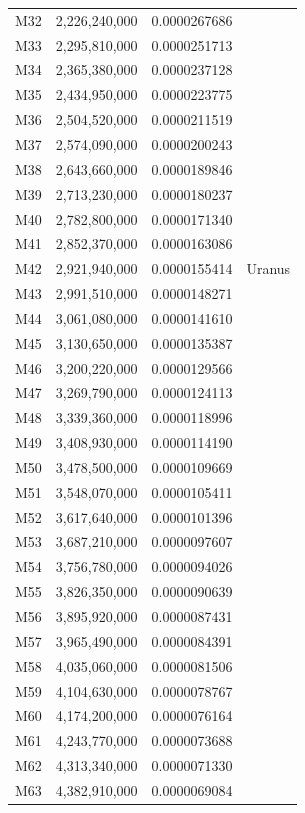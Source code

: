 \documentclass[11pt, a4paper]{article}
\begin{document}
\begin{longtable}{@{} c c c l @{}}
  M32 & 2,226,240,000 & 0.0000267686 &  \\
  M33 & 2,295,810,000 & 0.0000251713 &  \\
  M34 & 2,365,380,000 & 0.0000237128 &  \\
  M35 & 2,434,950,000 & 0.0000223775 &  \\
  M36 & 2,504,520,000 & 0.0000211519 &  \\
  M37 & 2,574,090,000 & 0.0000200243 &  \\
  M38 & 2,643,660,000 & 0.0000189846 &  \\
  M39 & 2,713,230,000 & 0.0000180237 &  \\
  M40 & 2,782,800,000 & 0.0000171340 &  \\
  M41 & 2,852,370,000 & 0.0000163086 &  \\
  M42 & 2,921,940,000 & 0.0000155414 & Uranus \\
  M43 & 2,991,510,000 & 0.0000148271 &  \\
  M44 & 3,061,080,000 & 0.0000141610 &  \\
  M45 & 3,130,650,000 & 0.0000135387 &  \\
  M46 & 3,200,220,000 & 0.0000129566 &  \\
  M47 & 3,269,790,000 & 0.0000124113 &  \\
  M48 & 3,339,360,000 & 0.0000118996 &  \\
  M49 & 3,408,930,000 & 0.0000114190 &  \\
  M50 & 3,478,500,000 & 0.0000109669 &  \\
  M51 & 3,548,070,000 & 0.0000105411 &  \\
  M52 & 3,617,640,000 & 0.0000101396 &  \\
  M53 & 3,687,210,000 & 0.0000097607 &  \\
  M54 & 3,756,780,000 & 0.0000094026 &  \\
  M55 & 3,826,350,000 & 0.0000090639 &  \\
  M56 & 3,895,920,000 & 0.0000087431 &  \\
  M57 & 3,965,490,000 & 0.0000084391 &  \\
  M58 & 4,035,060,000 & 0.0000081506 &  \\
  M59 & 4,104,630,000 & 0.0000078767 &  \\
  M60 & 4,174,200,000 & 0.0000076164 &  \\
  M61 & 4,243,770,000 & 0.0000073688 &  \\
  M62 & 4,313,340,000 & 0.0000071330 &  \\
  M63 & 4,382,910,000 & 0.0000069084 &  \\

\end{longtable}
\end{document}
